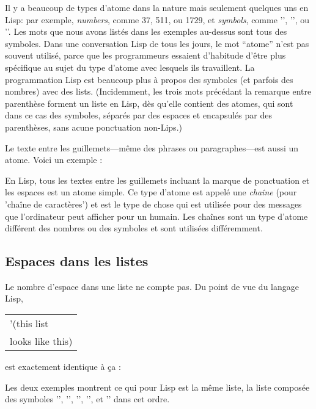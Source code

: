 Il y a beaucoup de types d'atome dans la nature mais seulement
quelques uns en Lisp: par exemple, \textit{numbers}, comme 37, 511, ou
1729, et \textit{symbols}, comme '\tm{+}', '', ou
''. Les mots que nous avons listés dans les
exemples au-dessus sont tous des symboles. Dans une conversation Lisp
de tous les jours, le mot ``atome'' n'est pas souvent utilisé, parce
que les programmeurs essaient d'habitude d'être plus spécifique au
sujet du type d'atome avec lesquels ils travaillent. La programmation
Lisp est beaucoup plus à propos des symboles (et parfois des nombres)
avec des lists. (Incidemment, les trois mots précédant la remarque
entre parenthèse forment un liste en Lisp, dès qu'elle contient des
atomes, qui sont dans ce cas des symboles, séparés par des espaces et
encapsulés par des parenthèses, sans acune ponctuation non-Lips.)

Le texte entre les guillemets---même des phrases ou paragraphes---est
aussi un atome. Voici un exemple : 
\begin{center}
\end{center}

En Lisp, tous les textes entre les guillemets incluant la marque de
ponctuation et les espaces est un atome simple. Ce type d'atome est
appelé une \textit{chaîne} (pour 'chaîne de caractères') et est le
type de chose qui est utilisée pour des messages que l'ordinateur peut
afficher pour un humain. Les chaînes sont un type d'atome différent
des nombres ou des symboles et sont utilisées différemment. 

\subsection{Espaces dans les listes}

Le nombre d'espace dans une liste ne compte pas. Du point de vue du
langage Lisp,
\begin{center}
  \begin{tabular}[m]{>{\ttfamily}l}
    '(this list\\
    \quad looks like this)
  \end{tabular}
\end{center}

est exactement identique à ça :
\begin{center}
\end{center}

Les deux exemples montrent ce qui pour Lisp est la même liste, la
liste composée des symboles '', '', '',
'', et '' dans cet ordre.

